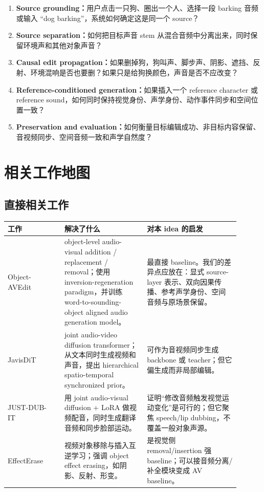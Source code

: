 \begin{enumerate}[leftmargin=2em]
  \item \textbf{Source grounding：}用户点击一只狗、圈出一个人、选择一段 barking 音频或输入 ``dog barking''，系统如何确定这是同一个 source？
  \item \textbf{Source separation：}如何把目标声音 stem 从混合音频中分离出来，同时保留环境声和其他对象声音？
  \item \textbf{Causal edit propagation：}如果删掉狗，狗叫声、脚步声、阴影、遮挡、反射、环境混响是否也要删？如果只是给狗换颜色，声音是否不应改变？
  \item \textbf{Reference-conditioned generation：}如果插入一个 reference character 或 reference sound，如何同时保持视觉身份、声学身份、动作事件同步和空间位置一致？
  \item \textbf{Preservation and evaluation：}如何衡量目标编辑成功、非目标内容保留、音视频同步、空间音频一致和声学自然度？
\end{enumerate}

\section{相关工作地图}

\subsection{直接相关工作}

\begin{longtable}{p{0.22\linewidth}p{0.32\linewidth}p{0.36\linewidth}}
\toprule
\textbf{工作} & \textbf{解决了什么} & \textbf{对本 idea 的启发} \\
\midrule
Object-AVEdit~\cite{objectavedit2026} & object-level audio-visual addition / replacement / removal；使用 inversion-regeneration paradigm，并训练 word-to-sounding-object aligned audio generation model。 & 最直接 baseline。我们的差异点应放在：显式 source-layer 表示、双向因果传播、参考声学身份、空间音频与原场景保留。 \\
\midrule
JavisDiT~\cite{javisdit2026} & joint audio-video diffusion transformer；从文本同时生成视频和声音，提出 hierarchical spatio-temporal synchronized prior。 & 可作为音视频同步生成 backbone 或 teacher；但它偏生成而非局部编辑。 \\
\midrule
JUST-DUB-IT~\cite{justdubit2026} & 用 joint audio-visual diffusion + LoRA 做视频配音，同时生成翻译音频和同步脸部运动。 & 证明“修改音频触发视觉运动变化”是可行的；但它聚焦 speech/lip dubbing，不覆盖一般对象声源。 \\
\midrule
EffectErase~\cite{effecterase2026} & 视频对象移除与插入互逆学习；强调 object effect erasing，如阴影、反射、形变。 & 是视觉侧 removal/insertion 强 baseline；可以接音频分离/补全模块变成 AV baseline。 \\
\bottomrule
\end{longtable}

